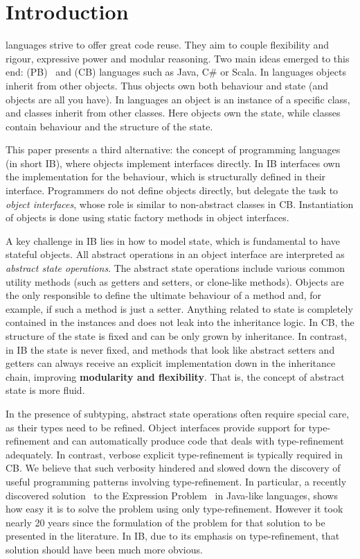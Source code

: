 \section{Introduction}\label{sec:intro}

\Objectoriented languages strive to offer great code reuse.
They aim to couple flexibility and rigour, expressive power and
modular reasoning.  Two main ideas emerged to this end: 
\prototypebased (PB)~\cite{Ungar87self} and \classbased (CB) languages such as
Java, C\# or Scala.  In \prototypebased
languages objects inherit from other objects. Thus objects own
both behaviour and state (and objects are all you have).
In \classbased languages an object is an instance of a specific class,
and classes inherit from other classes.  Here objects own the state,
while classes contain behaviour and the structure of the state.

This paper presents a third alternative: the concept of
\textbf{\interfacebased} \objectoriented programming languages (in short IB), where objects 
implement interfaces directly. In IB interfaces own the implementation
for the behaviour, which is structurally defined in their
interface. Programmers do not define objects directly, but delegate
the task to \emph{object interfaces}, whose role is similar to non-abstract 
classes in CB. Instantiation of objects is
done using static factory methods in object interfaces.

A key challenge in IB lies in how to model state, which is
fundamental to have stateful objects. All abstract operations in an
object interface are interpreted as \emph{abstract state
  operations}. The abstract state operations include various common
utility methods (such as getters and setters, or clone-like
methods). Objects are the only responsible to define the ultimate
behaviour of a method and, for example, if such a method is just a
setter. Anything related to state is completely contained in the
instances and does not leak into the inheritance logic.  In CB, the structure of the state is fixed and can be only grown
by inheritance.  In contrast, in IB the state is never
fixed, and methods that look like abstract setters and getters
can always receive an explicit implementation down in the inheritance
chain, improving \textbf{modularity and flexibility}.  That is, the
concept of abstract state is more fluid.

In the presence of subtyping, abstract state operations often require
special care, as their types need to be refined. Object interfaces
provide support for type-refinement and can automatically produce code
that deals with type-refinement adequately. In contrast,
 verbose explicit type-refinement
 is typically required in CB.
  We believe that such verbosity hindered and slowed
down the discovery of useful programming patterns involving
type-refinement. In particular, a recently discovered
solution~\cite{eptrivially} to the Expression
Problem~\cite{wadler98expression} in Java-like languages, shows how easy it is to solve
the problem using only type-refinement. However it took nearly 20
years since the formulation of the problem for that
solution to be presented in the literature. In IB, due to
its emphasis on type-refinement, that solution should have been much
more obvious.

